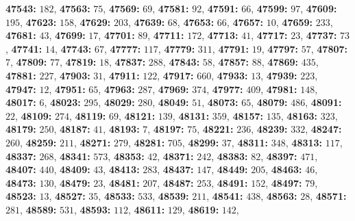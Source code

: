 \textsf{\bfseries 47543:} $182$, \textsf{\bfseries 47563:} $75$, \textsf{\bfseries 47569:} $69$, \textsf{\bfseries 47581:} $92$, \textsf{\bfseries 47591:} $66$, \textsf{\bfseries 47599:} $97$, \textsf{\bfseries 47609:} $195$, \textsf{\bfseries 47623:} $158$, \textsf{\bfseries 47629:} $203$, \textsf{\bfseries 47639:} $68$, \textsf{\bfseries 47653:} $66$, \textsf{\bfseries 47657:} $10$, \textsf{\bfseries 47659:} $233$, \textsf{\bfseries 47681:} $43$, \textsf{\bfseries 47699:} $17$, \textsf{\bfseries 47701:} $89$, \textsf{\bfseries 47711:} $172$, \textsf{\bfseries 47713:} $41$, \textsf{\bfseries 47717:} $23$, \textsf{\bfseries 47737:} $73$, \textsf{\bfseries 47741:} $14$, \textsf{\bfseries 47743:} $67$, \textsf{\bfseries 47777:} $117$, \textsf{\bfseries 47779:} $311$, \textsf{\bfseries 47791:} $19$, \textsf{\bfseries 47797:} $57$, \textsf{\bfseries 47807:} $7$, \textsf{\bfseries 47809:} $77$, \textsf{\bfseries 47819:} $18$, \textsf{\bfseries 47837:} $288$, \textsf{\bfseries 47843:} $58$, \textsf{\bfseries 47857:} $88$, \textsf{\bfseries 47869:} $435$, \textsf{\bfseries 47881:} $227$, \textsf{\bfseries 47903:} $31$, \textsf{\bfseries 47911:} $122$, \textsf{\bfseries 47917:} $660$, \textsf{\bfseries 47933:} $13$, \textsf{\bfseries 47939:} $223$, \textsf{\bfseries 47947:} $12$, \textsf{\bfseries 47951:} $65$, \textsf{\bfseries 47963:} $287$, \textsf{\bfseries 47969:} $374$, \textsf{\bfseries 47977:} $409$, \textsf{\bfseries 47981:} $148$, \textsf{\bfseries 48017:} $6$, \textsf{\bfseries 48023:} $295$, \textsf{\bfseries 48029:} $280$, \textsf{\bfseries 48049:} $51$, \textsf{\bfseries 48073:} $65$, \textsf{\bfseries 48079:} $486$, \textsf{\bfseries 48091:} $22$, \textsf{\bfseries 48109:} $274$, \textsf{\bfseries 48119:} $69$, \textsf{\bfseries 48121:} $139$, \textsf{\bfseries 48131:} $359$, \textsf{\bfseries 48157:} $135$, \textsf{\bfseries 48163:} $323$, \textsf{\bfseries 48179:} $250$, \textsf{\bfseries 48187:} $41$, \textsf{\bfseries 48193:} $7$, \textsf{\bfseries 48197:} $75$, \textsf{\bfseries 48221:} $236$, \textsf{\bfseries 48239:} $332$, \textsf{\bfseries 48247:} $260$, \textsf{\bfseries 48259:} $211$, \textsf{\bfseries 48271:} $279$, \textsf{\bfseries 48281:} $705$, \textsf{\bfseries 48299:} $37$, \textsf{\bfseries 48311:} $348$, \textsf{\bfseries 48313:} $117$, \textsf{\bfseries 48337:} $268$, \textsf{\bfseries 48341:} $573$, \textsf{\bfseries 48353:} $42$, \textsf{\bfseries 48371:} $242$, \textsf{\bfseries 48383:} $82$, \textsf{\bfseries 48397:} $471$, \textsf{\bfseries 48407:} $440$, \textsf{\bfseries 48409:} $43$, \textsf{\bfseries 48413:} $283$, \textsf{\bfseries 48437:} $147$, \textsf{\bfseries 48449:} $205$, \textsf{\bfseries 48463:} $46$, \textsf{\bfseries 48473:} $130$, \textsf{\bfseries 48479:} $23$, \textsf{\bfseries 48481:} $207$, \textsf{\bfseries 48487:} $253$, \textsf{\bfseries 48491:} $152$, \textsf{\bfseries 48497:} $79$, \textsf{\bfseries 48523:} $13$, \textsf{\bfseries 48527:} $35$, \textsf{\bfseries 48533:} $533$, \textsf{\bfseries 48539:} $211$, \textsf{\bfseries 48541:} $438$, \textsf{\bfseries 48563:} $28$, \textsf{\bfseries 48571:} $281$, \textsf{\bfseries 48589:} $531$, \textsf{\bfseries 48593:} $112$, \textsf{\bfseries 48611:} $129$, \textsf{\bfseries 48619:} $142$, 
